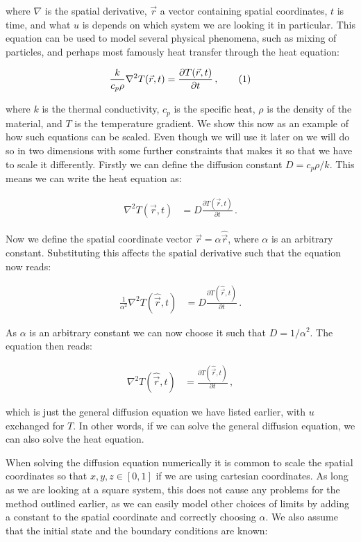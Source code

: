 \documentclass[reprint,english,notitlepage]{revtex4-1}  %
\newcommand\numberthis{\addtocounter{equation}{1}\tag{\theequation}}
\begin{document}
where $\nabla$ is the spatial derivative, $\vec{r}$ a vector containing spatial coordinates, $t$ is time, and what $u$ is depends on which system we are looking it in particular. This equation can be used to model several physical phenomena, such as mixing of particles, and perhaps most famously heat transfer through the heat equation:

\begin{align*}
\frac{k}{c_p \rho} \nabla^2 T(\vec{r},t) = \frac{\partial T (\vec{r},t)}{\partial t} \, , \numberthis \label{eq:heat_equation_general}
\end{align*}

where $k$ is the thermal conductivity, $c_p$ is the specific heat, $\rho$ is the density of the material, and $T$ is the temperature gradient. We show this now as an example of how such equations can be scaled. Even though we will use it later on we will do so in two dimensions with some further constraints that makes it so that we have to scale it differently. Firstly we can define the diffusion constant $D = c_p \rho / k$. This means we can write the heat equation as:

\begin{align*}
\nabla^2 T(\vec{r},t) &= D \frac{\partial T(\vec{r},t)}{\partial t} \, .
\end{align*}

Now we define the spatial coordinate vector $\vec{r} = \alpha \hat{\vec{r}}$, where $\alpha$ is an arbitrary constant. Substituting this affects the spatial derivative such that the equation now reads:

\begin{align*}
\frac{1}{\alpha^2} \nabla^2 T(\hat{\vec{r}},t) &= D \frac{\partial T(\hat{\vec{r}},t)}{\partial t} \, .
\end{align*}  

As $\alpha$ is an arbitrary constant we can now choose it such that $D = 1/\alpha^2$. The equation then reads:

\begin{align*}
\nabla^2 T(\hat{\vec{r}},t) &= \frac{\partial T(\hat{\vec{r}},t)}{\partial t} \, ,
\end{align*}

which is just the general diffusion equation we have listed earlier, with $u$ exchanged for $T$. In other words, if we can solve the general diffusion equation, we can also solve the heat equation.

When solving the diffusion equation numerically it is common to scale the spatial coordinates so that $x,y,z \in [0,1]$ if we are using cartesian coordinates. As long as we are looking at a square system, this does not cause any problems for the method outlined earlier, as we can easily model other choices of limits by adding a constant to the spatial coordinate and correctly choosing $\alpha$. We also assume that the initial state and the boundary conditions are known: 
\end{document}
